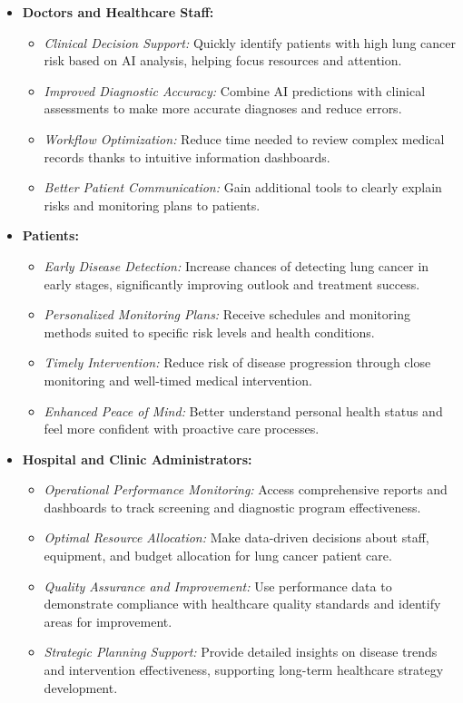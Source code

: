 \begin{itemize}
    \item \textbf{Doctors and Healthcare Staff:}
    \begin{itemize}
        \item \textit{Clinical Decision Support:} Quickly identify patients with high lung cancer risk based on AI analysis, helping focus resources and attention.
        \item \textit{Improved Diagnostic Accuracy:} Combine AI predictions with clinical assessments to make more accurate diagnoses and reduce errors.
        \item \textit{Workflow Optimization:} Reduce time needed to review complex medical records thanks to intuitive information dashboards.
        \item \textit{Better Patient Communication:} Gain additional tools to clearly explain risks and monitoring plans to patients.
    \end{itemize}
    
    \item \textbf{Patients:}
    \begin{itemize}
        \item \textit{Early Disease Detection:} Increase chances of detecting lung cancer in early stages, significantly improving outlook and treatment success.
        \item \textit{Personalized Monitoring Plans:} Receive schedules and monitoring methods suited to specific risk levels and health conditions.
        \item \textit{Timely Intervention:} Reduce risk of disease progression through close monitoring and well-timed medical intervention.
        \item \textit{Enhanced Peace of Mind:} Better understand personal health status and feel more confident with proactive care processes.
    \end{itemize}

    \item \textbf{Hospital and Clinic Administrators:}
    \begin{itemize}
        \item \textit{Operational Performance Monitoring:} Access comprehensive reports and dashboards to track screening and diagnostic program effectiveness.
        \item \textit{Optimal Resource Allocation:} Make data-driven decisions about staff, equipment, and budget allocation for lung cancer patient care.
        \item \textit{Quality Assurance and Improvement:} Use performance data to demonstrate compliance with healthcare quality standards and identify areas for improvement.
        \item \textit{Strategic Planning Support:} Provide detailed insights on disease trends and intervention effectiveness, supporting long-term healthcare strategy development.
    \end{itemize}


\end{itemize}
